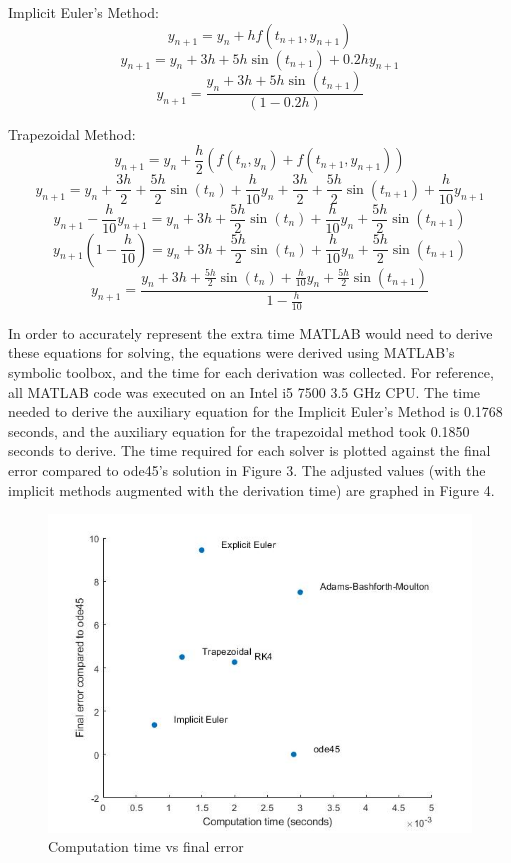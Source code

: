 \documentclass[11pt]{article}
\begin{document}
Implicit Euler's Method:
$$y_{n+1}=y_{n}+hf(t_{n+1}, y_{n+1})$$
$$y_{n+1}=y_{n}+3h+5h\sin(t_{n+1})+0.2hy_{n+1}$$
$$y_{n+1}=\frac{y_{n}+3h+5h\sin(t_{n+1})}{(1-0.2h)}$$

Trapezoidal Method:
$$y_{n+1}=y_{n}+\frac{h}{2}(f(t_{n},y_{n})+f(t_{n+1},y_{n+1}))$$
$$y_{n+1}=y_{n}+\frac{3h}{2}+\frac{5h}{2}\sin(t_{n})+\frac{h}{10}y_{n}+\frac{3h}{2}+\frac{5h}{2}\sin(t_{n+1})+\frac{h}{10}y_{n+1}$$
$$y_{n+1}-\frac{h}{10}y_{n+1}=y_{n}+3h+\frac{5h}{2}\sin(t_{n})+\frac{h}{10}y_{n}+\frac{5h}{2}\sin(t_{n+1})$$
$$y_{n+1}(1-\frac{h}{10})=y_{n}+3h+\frac{5h}{2}\sin(t_{n})+\frac{h}{10}y_{n}+\frac{5h}{2}\sin(t_{n+1})$$
$$
y_{n+1}=\frac{y_{n}+3h+\frac{5h}{2}\sin(t_{n})+\frac{h}{10}y_{n}+\frac{5h}{2}\sin(t_{n+1})}{1-\frac{h}{10}}$$

In order to accurately represent the extra time MATLAB would need to derive these
equations for solving, the equations were derived using MATLAB's symbolic
toolbox, and the time for each derivation was collected. For reference, all MATLAB
code was executed on an Intel i5 7500 3.5 GHz CPU. The time needed to derive
the auxiliary equation for the Implicit Euler's Method is  0.1768 seconds,
and the auxiliary equation for the trapezoidal method took 0.1850 seconds to derive.
The time required for each solver is plotted against the final error compared to 
ode45's solution in Figure 3. The adjusted values (with the implicit methods 
augmented with the derivation time) are graphed in Figure 4.

\newpage

\begin{figure} [h]
\centering
        \includegraphics[totalheight=10cm]{scatter1.jpg}
    \caption{Computation time vs final error}
    \label{figure3}
\end{figure}
\end{document}
